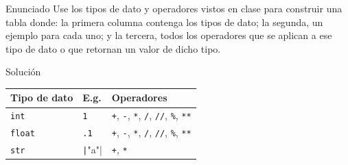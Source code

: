 \documentclass{ip-quiz}
\begin{document}
\makeheader
\maketitle

\begin{sectionbox}{Enunciado}
  Use los tipos de dato y operadores vistos en clase para construir una tabla donde: la primera columna contenga los tipos de dato; la segunda, un ejemplo para cada uno; y la tercera, todos los operadores que se aplican a ese tipo de dato o que retornan un valor de dicho tipo.
\end{sectionbox}

\begin{sectionbox}{Solución}
\begin{center}
\begin{tabular}{lll}
\hline
\textbf{Tipo de dato} & \textbf{E.g.} & \textbf{Operadores} \\
\hline
\texttt{int} & \texttt{1} & \texttt{+}, \texttt{-}, \texttt{*}, \texttt{/}, \texttt{//}, \texttt{\%}, \texttt{**} \\
\texttt{float} & \texttt{.1} & \texttt{+}, \texttt{-}, \texttt{*}, \texttt{/}, \texttt{//}, \texttt{\%}, \texttt{**} \\
\texttt{str} & \texttt|"a"| & \texttt{+}, \texttt{*} \\
\hline
\end{tabular}
\end{center}
\end{sectionbox}
\end{document}
